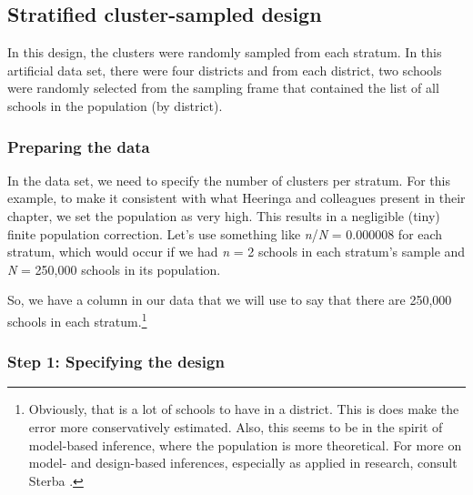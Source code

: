 \documentclass[
]{article}
\newenvironment{Shaded}{\begin{snugshade}}{\end{snugshade}}
\newcommand{\DecValTok}[1]{\textcolor[rgb]{0.00,0.00,0.81}{#1}}
\newcommand{\NormalTok}[1]{#1}
\newcommand{\OperatorTok}[1]{\textcolor[rgb]{0.81,0.36,0.00}{\textbf{#1}}}
\newcommand{\StringTok}[1]{\textcolor[rgb]{0.31,0.60,0.02}{#1}}
\begin{document}
\hypertarget{stratified-cluster-sampled-design}{%
\subsection{Stratified cluster-sampled design}\label{stratified-cluster-sampled-design}}

In this design, the clusters were randomly sampled from each stratum. In this artificial data set, there were four districts and from each district, two schools were randomly selected from the sampling frame that contained the list of all schools in the population (by district).

\hypertarget{preparing-the-data-1}{%
\subsubsection{Preparing the data}\label{preparing-the-data-1}}

In the data set, we need to specify the number of clusters per stratum. For this example, to make it consistent with what Heeringa and colleagues present in their chapter, we set the population as very high. This results in a negligible (tiny) finite population correction. Let's use something like \emph{n}/\emph{N} = 0.000008 for each stratum, which would occur if we had \emph{n} = 2 schools in each stratum's sample and \emph{N} = 250,000 schools in its population.

\begin{Shaded}
\end{Shaded}

So, we have a column in our data that we will use to say that there are 250,000 schools in each stratum.\footnote{Obviously, that is a lot of schools to have in a district. This is does make the error more conservatively estimated. Also, this seems to be in the spirit of model-based inference, where the population is more theoretical. For more on model- and design-based inferences, especially as applied in research, consult Sterba \citeyearpar{sterba_alternative_2009}.}

\hypertarget{step-1-specifying-the-design-2}{%
\subsubsection{Step 1: Specifying the design}\label{step-1-specifying-the-design-2}}
\end{document}

